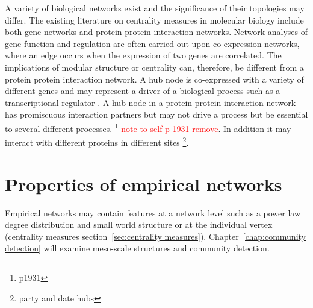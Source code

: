  A variety of biological networks exist and the significance of their topologies may differ. The existing literature on centrality measures in molecular biology include both  gene networks and  protein-protein interaction networks. Network analyses of gene function and regulation are often carried out upon co-expression networks, where an edge occurs when the expression of two genes are correlated.\cite{zhang2005general} The implications of modular structure or centrality can, therefore, be different from a protein protein interaction network. A hub node is co-expressed with a variety of different genes and may represent a driver of a biological process such as a transcriptional regulator \cite{parikshak2015systems}.
 A hub node in a protein-protein interaction network has promiscuous interaction partners but may not drive a process but be essential to several different processes. \cite{patil2010hub}\footnote{p1931} \textcolor{red}{note to self p 1931 remove}. In addition it may interact with different proteins in different sites \cite{han2004evidence}\footnote{party and date hubs}.
 



\section{Properties of empirical networks}
\label{sec:Properties of empirical networks}
Empirical networks may contain features at a network level such as a power law degree distribution \cite{barabasi1999emergence} \cite{barabasi1999mean} and small world structure \cite{watts1998collective} or at the individual vertex (centrality measures section~\ref{sec:centrality measures}). Chapter~\ref{chap:community detection}  will examine meso-scale structures and community detection. 

